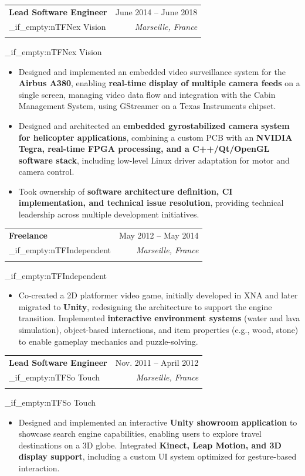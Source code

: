 \documentclass[a4paper,11pt]{article}
\makeatletter
\newcommand{\resumeItem}[1]{
  \item\small{
    {#1 \vspace{-2pt}}
  }
}
\newcommand{\resumeSubheading}[4]{
  \vspace{-2pt}\item
    \begin{tabular*}{0.97\textwidth}[t]{l@{\extracolsep{\fill}}r}
      \textbf{#1} & #2 \\
      \tl_if_empty:nTF{#3}
        {}
        {\textit{\small#3} & \textit{\small #4} \\}
    \end{tabular*}\vspace{-7pt}
    \tl_if_empty:nTF{#3}{\par\vspace{5pt}}{}
}
\newcommand{\resumeItemListStart}{\begin{itemize}}
\newcommand{\resumeItemListEnd}{\end{itemize}\vspace{-5pt}}
\makeatother
\begin{document}
    \resumeSubheading
      {Lead Software Engineer}{June 2014 -- June 2018}
      {Nex Vision}{Marseille, France}
      \resumeItemListStart
        \resumeItem{Designed and implemented an embedded video surveillance system for the \textbf{Airbus A380}, enabling \textbf{real-time display of multiple camera feeds} on a single screen, managing video data flow and integration with the Cabin Management System, using GStreamer on a Texas Instruments chipset.}
        \resumeItem{Designed and architected an \textbf{embedded gyrostabilized camera system for helicopter applications}, combining a custom PCB with an \textbf{NVIDIA Tegra, real-time FPGA processing, and a C++/Qt/OpenGL software stack}, including low-level Linux driver adaptation for motor and camera control.}
        \resumeItem{Took ownership of \textbf{software architecture definition, CI implementation, and technical issue resolution}, providing technical leadership across multiple development initiatives.}
      \resumeItemListEnd

    \resumeSubheading
      {Freelance}{May 2012 -- May 2014}
      {Independent}{Marseille, France}
      \resumeItemListStart
        \resumeItem{Co-created a 2D platformer video game, initially developed in XNA and later migrated to \textbf{Unity}, redesigning the architecture to support the engine transition. Implemented \textbf{interactive environment systems} (water and lava simulation), object-based interactions, and item properties (e.g., wood, stone) to enable gameplay mechanics and puzzle-solving.}
      \resumeItemListEnd

    \resumeSubheading
      {Lead Software Engineer}{Nov. 2011 -- April 2012}
      {So Touch}{Marseille, France}
      \resumeItemListStart
        \resumeItem{Designed and implemented an interactive \textbf{Unity showroom application} to showcase search engine capabilities, enabling users to explore travel destinations on a 3D globe. Integrated \textbf{Kinect, Leap Motion, and 3D display support}, including a custom UI system optimized for gesture-based interaction.}
      \resumeItemListEnd

\end{document}
